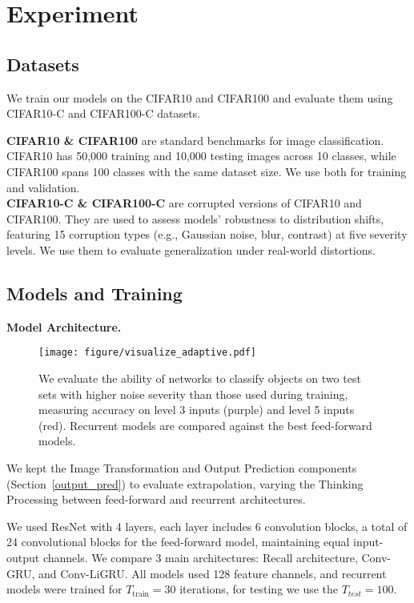 \section{Experiment}
\subsection{Datasets}  
We train our models on the CIFAR10 and CIFAR100 and evaluate them using CIFAR10-C and CIFAR100-C datasets.  

\textbf{CIFAR10 \& CIFAR100} 
are standard benchmarks for image classification. 
CIFAR10 has 50,000 training and 10,000 testing images across 10 classes, while CIFAR100 spans 100 classes with the same dataset size. 
We use both for training and validation.  
\\
\textbf{CIFAR10-C \& CIFAR100-C} 
are corrupted versions of CIFAR10 and CIFAR100. 
They are used to assess models' robustness to distribution shifts, featuring 15 corruption types (e.g., Gaussian noise, blur, contrast) at five severity levels. 
We use them to evaluate generalization under real-world distortions.
\subsection{Models and Training}
\textbf{Model Architecture.} 
\begin{figure}[t!]
    \centering
    \texttt{[image: figure/visualize\_adaptive.pdf]}
    \caption{We evaluate the ability of networks to classify objects on two test sets with higher noise severity than those used during training, measuring accuracy on level 3 inputs (purple) and level 5 inputs (red). Recurrent models are compared against the best feed-forward models.}
    \label{fig:visualize-adaptive}
\end{figure}
We kept the Image Transformation and Output Prediction components (Section~\ref{output_pred}) to evaluate extrapolation, varying the Thinking Processing between feed-forward and recurrent architectures.

We used ResNet \citep{he2016residual} with 4 layers, each layer includes 6 convolution blocks, a total of 24 convolutional blocks for the feed-forward model, maintaining equal input-output channels. 
We compare 3 main architectures: Recall architecture, Conv-GRU, and Conv-LiGRU. 
All models used 128 feature channels, and recurrent models were trained for \( T_{\text{train}} = 30 \) iterations, for testing we use the $T_{test} = 100$.  


